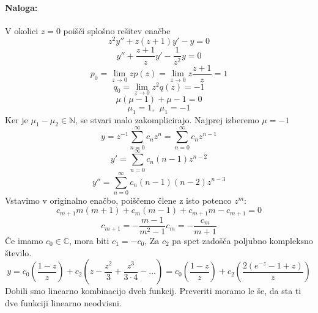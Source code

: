 \documentclass[a4paper]{article}
\newcommand{\C}{\mathbb{C}}
\newcommand{\N}{\mathbb{N}}
\newcommand{\Sum}[2][0]{\sum_{{#2} = {#1}}^{\infty}}
\begin{document}
\paragraph{Naloga:} V okolici $z=0$ poišči splošno rešitev enačbe
$$z^2 y'' + z(z+1)y' - y = 0$$
$$y'' + \frac{z+1}{z}y' - \frac{1}{z^2}y = 0$$
$$p_0 = \lim_{z\to0} zp(z) = \lim_{z\to0} z\frac{z+1}{z} = 1$$
$$q_0 = \lim_{z\to0} z^2q(z) = -1$$
$$\mu(\mu-1) + \mu - 1 = 0$$
$$\mu_1 = 1,~~\mu_1 = -1$$
Ker je $\mu_1 - \mu_2 \in \N$, se stvari malo zakomplicirajo. Najprej izberemo $\mu = -1$
$$y = z^{-1}\Sum{n} c_nz^n = \Sum{n}c_nz^{n-1}$$
$$y' = \Sum{n}c_n(n-1)z^{n-2}$$
$$y'' = \Sum{n} c_n(n-1)(n-2)z^{n-3}$$
Vstavimo v originalno enačbo, poiščemo člene z isto potenco $z^m$:
$$c_{m+1}m(m+1) + c_m(m-1) + c_{m+1} m - c_{m+1} = 0$$
$$c_{m+1} = -\frac{m-1}{m^2-1}c_m = -\frac{c_m}{m+1}$$
Če imamo $c_0 \in \C$, mora biti $c_1 = -c_0$, Za $c_2$ pa spet zadošča poljubno kompleksno število.
$$y = c_0\left(\frac{1-z}{z}\right) + c_2\left(z - \frac{z^2}{3} + \frac{z^3}{3\cdot 4} - ...\right) = c_0 \left(\frac{1-z}{z}\right) + c_2 \left(\frac{2(e^{-z} - 1 + z)}{z}\right)$$
Dobili smo linearno kombinacijo dveh funkcij. Preveriti moramo le še, da sta ti dve funkciji linearno neodvisni.
\end{document}
